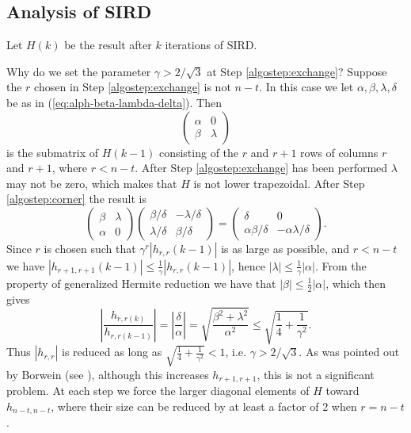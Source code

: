 \documentclass{sig-alternate}
\numberwithin{theorem}{section} \numberwithin{equation}{section}
\begin{document}
\subsection{Analysis of SIRD}
Let $H(k)$ be the result after  $k$ iterations of SIRD.

Why do we set the parameter $\gamma > 2/\sqrt{3}$ at Step
\ref{algostep:exchange}?  Suppose the $r$ chosen in Step
\ref{algostep:exchange} is not $n - t$. In this case we let $\alpha,
\beta, \lambda, \delta$ be as in (\ref{eq:alph-beta-lambda-delta}).
Then
\[
\left (\begin{matrix} \alpha&0\\
\beta&\lambda
\end{matrix}
\right )
\]
is the submatrix of $H(k-1)$ consisting of the $r$ and $r + 1$ rows
of columns $r$ and $r + 1$, where $r < n - t$.   After Step
\ref{algostep:exchange} has been performed $\lambda$ may not be
zero, which makes that $H$ is not lower trapezoidal.  After Step \ref{algostep:corner} the result is
\begin{equation}\label{eq:exchange}
\left (\begin{matrix}\beta&\lambda  \\
\alpha&0
\end{matrix}
\right )
\left (\begin{matrix} \beta/\delta & -\lambda/\delta\\
\lambda/\delta&\beta/\delta
\end{matrix}
\right )  =
\left (\begin{matrix} \delta & 0\\
\alpha \beta/\delta&-\alpha\lambda/\delta
\end{matrix}
\right ).
\end{equation}
Since $r$ is chosen such that $\gamma^r|h_{r,r}(k - 1)|$ is as large
as possible, and $r < n - t$ we have $|h_{r+1,r+1}(k - 1)| \leq
\frac{1}{\gamma}|h_{r,r}(k - 1)|$, hence $|\lambda| \leq
\frac{1}{\gamma}|\alpha|$. From the property of generalized Hermite
reduction we have that $|\beta| \leq
\frac{1}{2}|\alpha|$, which then gives
\begin{equation}\label{eq:delta}
\left|\frac{h_{r,r(k)}}{h_{r,r(k-1)}}\right| =
\left|\frac{\delta}{\alpha}\right| = \sqrt{\frac{\beta^2 +
\lambda^2}{\alpha^2}} \leq  \sqrt{\frac{1}{4} + \frac{1}{\gamma^2}}.
\end{equation}
Thus $|h_{r,r}|$ is reduced as long as $\sqrt{\frac{1}{4} +
\frac{1}{\gamma^2}} < 1$, i.e. $\gamma > 2/\sqrt{3}$. As was pointed
out by Borwein (see \cite {Bor2002}), although this
increases $h_{r+1,r+1}$, this is not a significant problem. At each
step we force the larger diagonal elements of $H$ toward
$h_{n-t,n-t}$, where their size can be reduced by at least a factor
of $2$ when $r = n-t$.
\end{document}
